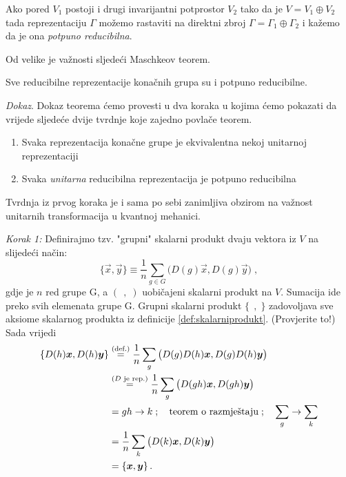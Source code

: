 \begin{definicija}
Ako pored $V_1$ postoji i drugi invarijantni potprostor $V_2$ 
tako da je $V=V_1 \oplus V_2$ tada reprezentaciju $\Gamma$
možemo rastaviti na direktni zbroj $\Gamma=\Gamma_1
\oplus \Gamma_2$ i kažemo da je ona \emph{potpuno reducibilna}.
\end{definicija}

Od velike je važnosti sljedeći Maschkeov teorem.

\begin{teorem}[Maschke]
      
Sve reducibilne reprezentacije konačnih grupa su i potpuno reducibilne.
\end{teorem}

\emph{Dokaz}. Dokaz teorema ćemo provesti u dva koraka u kojima ćemo
pokazati da vrijede sljedeće dvije tvrdnje koje zajedno
povlače teorem.
\begin{enumerate}[noitemsep]
    \item Svaka reprezentacija konačne grupe je ekvivalentna nekoj unitarnoj reprezentaciji
    \item Svaka \emph{unitarna} reducibilna reprezentacija je potpuno reducibilna
\end{enumerate}
Tvrdnja iz prvog koraka je i sama po sebi zanimljiva obzirom na važnost unitarnih transformacija
u kvantnoj mehanici. 

\emph{Korak 1:} Definirajmo tzv. "grupni" skalarni produkt dvaju
vektora iz $V$ na slijedeći način:
\begin{equation*}
\{\vec{x}, \vec{y}\} \equiv \frac{1}{n}\sum_{g\in G} \big( D(g)\vec{x},
 D(g)\vec{y}\big) \;, 
\end{equation*}
gdje je $n$ red grupe G, a $(\;\,,\;)$ uobičajeni skalarni produkt na $V$.
Sumacija ide preko svih elemenata grupe G.
Grupni skalarni produkt $\{\;\,,\;\}$ zadovoljava sve aksiome skalarnog
produkta iz definicije \ref{def:skalarniprodukt}. (Provjerite to!)
Sada vrijedi
\begin{equation*}
\begin{split}
\{D(h)\vec{x}, D(h)\vec{y}\} &\stackrel{\text{(def.)}}{=} \frac{1}{n}\sum_g \big( D(g) D(h) \vec{x},
 D(g) D(h) \vec{y} \big) \\
&\stackrel{\text{($D$ je rep.)}}= \frac{1}{n}\sum_g \big( D(gh)\vec{x} , D(gh)\vec{y} \big) \\
&=  gh\to k\;;\quad \text{teorem o razmještaju}\;;\quad \sum_g \to \sum_k \\
\index{Teorem!o razmještaju}
&= \frac{1}{n}\sum_k \big( D(k) \vec{x}, D(k) \vec{y} \big) \\
&= \{\vec{x}, \vec{y}\} \,.
\end{split}
\end{equation*}

